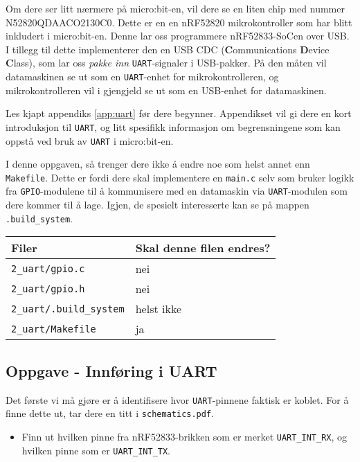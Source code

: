 Om dere ser litt nærmere på micro:bit-en, vil dere se en liten chip med nummer N52820QDAACO2130C0. Dette er en en nRF52820 mikrokontroller som har blitt inkludert i micro:bit-en. Denne lar oss programmere nRF52833-SoCen over USB. I tillegg til dette implementerer den en USB CDC (\textbf{C}ommunications \textbf{D}evice \textbf{C}lass), som lar oss \textit{pakke inn} \verb|UART|-signaler i USB-pakker. På den måten vil datamaskinen se ut som en \verb|UART|-enhet for mikrokontrolleren, og mikrokontrolleren vil i gjengjeld se ut som en USB-enhet for datamaskinen.

Les kjapt appendiks \ref{app:uart} før dere begynner. Appendikset vil gi dere en kort introduksjon til \verb|UART|, og litt spesifikk informasjon om begrensningene som kan oppstå ved bruk av \verb|UART| i micro:bit-en.

I denne oppgaven, så trenger dere ikke å endre noe som helst annet enn \verb|Makefile|. Dette er fordi dere skal implementere en \verb|main.c| selv som bruker logikk fra \verb|GPIO|-modulene til å kommunisere med en datamaskin via \verb|UART|-modulen som dere kommer til å lage. Igjen, de spesielt interesserte kan se på mappen \verb|.build_system|.

\begin{center}
 \begin{tabular}{|p{8.5cm} p{5.5cm}|} 
 \hline
 Filer & Skal denne filen endres?  \\ [0.5ex] 
 \hline\hline
 \verb|2_uart/gpio.c| & \quad \quad \quad \quad nei  \\ 
 \hline
  \verb|2_uart/gpio.h| & \quad \quad \quad \quad nei  \\ 
  \hline
  \verb|2_uart/.build_system| &  \quad \quad \quad \quad helst ikke \\ 
 \hline
 \verb|2_uart/Makefile| &  \quad \quad \quad \quad ja \\ 
 \hline
\end{tabular}
\end{center}


\subsection{Oppgave - Innføring i UART}

Det første vi må gjøre er å identifisere hvor \verb|UART|-pinnene faktisk er koblet. For å finne dette ut, tar dere en titt i \verb|schematics.pdf|. 

\begin{itemize}
    \item Finn ut hvilken pinne fra nRF52833-brikken som er merket \verb|UART_INT_RX|, og hvilken pinne som er \verb|UART_INT_TX|.
\end{itemize}

